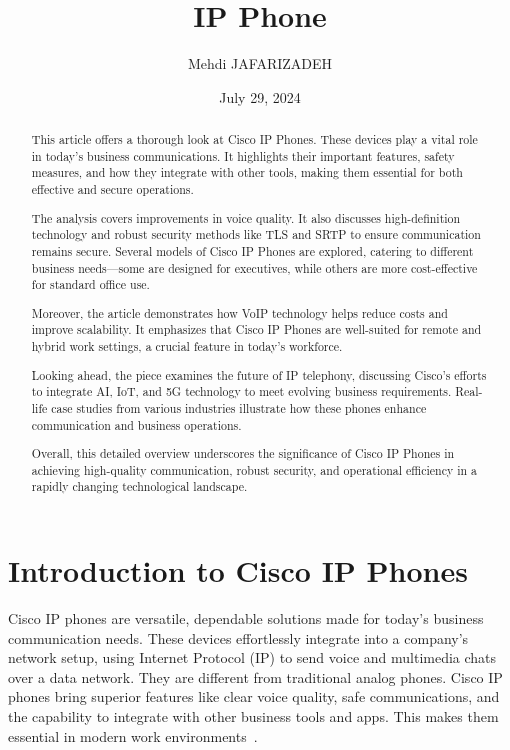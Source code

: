 \documentclass[11pt,a4paper]{article}
\title{IP Phone}
\author{Mehdi JAFARIZADEH}
\date{July 29, 2024}
\begin{document}
\maketitle

\begin{abstract}
  This article offers a thorough look at Cisco IP Phones. These devices play a vital role in today's business communications. It highlights their important features, safety measures, and how they integrate with other tools, making them essential for both effective and secure operations.

  The analysis covers improvements in voice quality. It also discusses high-definition technology and robust security methods like TLS and SRTP to ensure communication remains secure. Several models of Cisco IP Phones are explored, catering to different business needs—some are designed for executives, while others are more cost-effective for standard office use.

  Moreover, the article demonstrates how VoIP technology helps reduce costs and improve scalability. It emphasizes that Cisco IP Phones are well-suited for remote and hybrid work settings, a crucial feature in today's workforce.

  Looking ahead, the piece examines the future of IP telephony, discussing Cisco’s efforts to integrate AI, IoT, and 5G technology to meet evolving business requirements. Real-life case studies from various industries illustrate how these phones enhance communication and business operations.

Overall, this detailed overview underscores the significance of Cisco IP Phones in achieving high-quality communication, robust security, and operational efficiency in a rapidly changing technological landscape.
\end{abstract}

\newpage

\section*{Introduction to Cisco IP Phones}

Cisco IP phones are versatile, dependable solutions made for today’s business communication needs. These devices effortlessly integrate into a company’s network setup, using Internet Protocol (IP) to send voice and multimedia chats over a data network. They are different from traditional analog phones. Cisco IP phones bring superior features like clear voice quality, safe communications, and the capability to integrate with other business tools and apps. This makes them essential in modern work environments~\cite{8800-series}.
\end{document}
